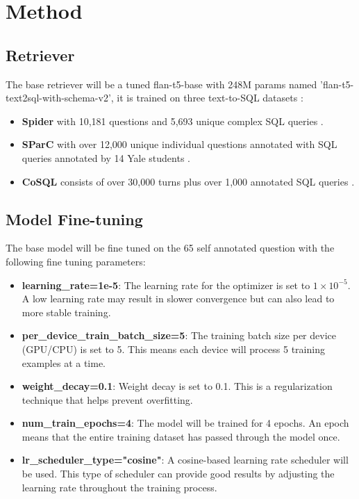 \documentclass[11pt]{article}
\begin{document}
\section{Method}

\subsection{Retriever}

The base retriever will be a tuned flan-t5-base with 248M params \cite{flant5} named 'flan-t5-text2sql-with-schema-v2'\cite{t5tuned}, it is trained on three text-to-SQL datasets :
\begin{itemize}
    \item \textbf{Spider} with 10,181 questions and 5,693 unique complex SQL queries \cite{spider}.
    \item \textbf{SParC} with over 12,000 unique individual questions annotated with SQL queries annotated by 14 Yale students \cite{sparc}.
    \item \textbf{CoSQL} consists of over 30,000 turns plus over 1,000 annotated SQL queries \cite{cosql}.
\end{itemize}


\subsection{Model Fine-tuning}
The base model will be fine tuned on the 65 self annotated question with the following fine tuning parameters:
\begin{itemize}
    \item \textbf{learning\_rate=1e-5}: The learning rate for the optimizer is set to $1 \times 10^{-5}$. A low learning rate may result in slower convergence but can also lead to more stable training.
    \item \textbf{per\_device\_train\_batch\_size=5}: The training batch size per device (GPU/CPU) is set to 5. This means each device will process 5 training examples at a time.
    \item \textbf{weight\_decay=0.1}: Weight decay is set to 0.1. This is a regularization technique that helps prevent overfitting.
    \item \textbf{num\_train\_epochs=4}: The model will be trained for 4 epochs. An epoch means that the entire training dataset has passed through the model once.
    \item \textbf{lr\_scheduler\_type="cosine"}: A cosine-based learning rate scheduler will be used. This type of scheduler can provide good results by adjusting the learning rate throughout the training process.
\end{itemize}
\end{document}
